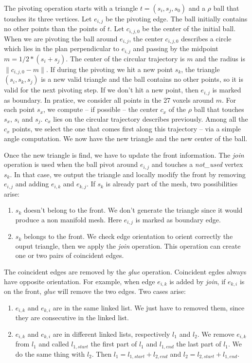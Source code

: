 \documentclass[a4paper]{article}
\begin{document}
The pivoting operation starts with a triangle $t =(s_i, s_j, s_0)$ and a $\rho$ ball that touches its three vertices. Let $e_{i,j}$ be the pivoting edge. The ball initially contains no other points than the points of $t$. Let $c_{i,j,0}$ be the center of the initial ball. When we are pivoting the ball around $e_{i,j}$, the center $c_{i,j,0}$ describes a circle which lies in the plan perpendicular to $e_{i,j}$ and passing by the midpoint $m = 1/2 * (s_i + s_j)$. The center of the circular trajectory is $m$ and the radius is $\| c_{i,j,0} - m \|$. If during the pivoting we hit a new point $s_k$, the triangle $(s_i, s_k, s_j)$ is a new valid triangle and the ball contains no other points, so it is valid for the next pivoting step. If we don't hit a new point, then $e_{i,j}$ is marked as boundary.
In pratice, we consider all points in the 27 voxels around $m$. For each point $s_x$, we compute -- if possible -- the center $c_x$ of the $\rho$ ball that touches $s_x$, $s_i$ and $s_j$. $c_x$ lies on the circular trajectory describes previously. Among all the $c_x$ points, we select the one that comes first along this trajectory -- via a simple angle computation. We now have the new triangle and the new center of the ball.

Once the new triangle is find, we have to update the front information. The \textit{join} operation is used when the ball pivot around $e_{i,j}$ and touches a \textit{not\_used} vertex $s_k$. In that case, we output the triangle and locally modify the front by removing $e_{i,j}$ and adding $e_{i,k}$ and $e_{k,j}$. If $s_k$ is already part of the mesh, two possibilities arise:
\begin{enumerate}
\item $s_k$ doesn't belong to the front. We don't generate the triangle since it would produce a non manifold mesh. Here $e_{i,j}$ is marked as boundary edge.
\item $s_k$ belongs to the front. We check edge orientation to orient correctly the ouput triangle, then we apply the \textit{join} operation. This operation can create one or two pairs of coincident edges.
\end{enumerate}

The coincident edges are removed by the \textit{glue} operation. Coincident egdes always have opposite orientation. For example, when edge $e_{i,k}$ is added by \textit{join}, if $e_{k,i}$ is on the front, \textit{glue} will remove the two edges. Two cases arise:
\begin{enumerate}
\item $e_{i,k}$ and $e_{k,i}$ are in the same linked list. We just have to removed them, since they are consecutive in the linked list.
\item $e_{i,k}$ and $e_{k,i}$ are in different linked lists, respectively $l_1$ and $l_2$. We remove $e_{i,k}$ from $l_1$ and called $l_{1,start}$ the first part of $l_1$ and $l_{1,end}$ the last part of $l_1$. We do the same thing with $l_2$. Then $l_1 = l_{1,start}+l_{2,end}$ and $l_2 = l_{2,start}+l_{1,end}$.
\end{enumerate}
\end{document}
